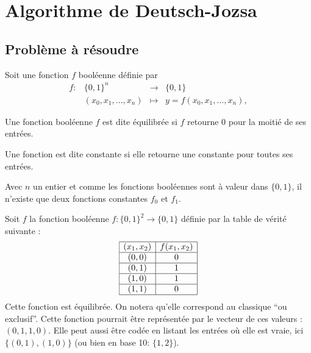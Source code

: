 \chapter{Algorithme de Deutsch-Jozsa}

\section{Problème à résoudre}
Soit une fonction $f$ booléenne définie par 
\[
  \begin{array}{llll}
    f :  &  \{0, 1\}^n              & \to       & \{ 0, 1 \} \\
         &  (x_0, x_1, \dots , x_n) & \mapsto   &  y = f(x_0, x_1, \dots , x_n), 
  \end{array}  
\]

\begin{definition}
  Une fonction booléenne $f$ est dite équilibrée si $f$ retourne 0
  pour la moitié de ses entrées.
\end{definition}

\begin{definition}
  Une fonction est dite constante si elle retourne une constante pour
  toutes ses entrées.
\end{definition}


\begin{rem}
  Avec $n$ un entier et comme les fonctions booléennes sont à valeur
  dans $\{0,1\}$, il n'existe que deux fonctions constantes $f_0$ et
  $f_1$.
\end{rem}

\begin{ex}
  Soit $f$ la fonction booléenne $f : \{0,1\}^2 \to \{0,1\}$ définie
  par la table de vérité suivante :
\[
  \begin{array}{|c|c|}
    \hline
   (x_1, x_2) & f(x_1,x_2) \\
    \hline
    (0,0) & 0 \\
    \hline
    (0,1) & 1 \\
    \hline
    (1,0) & 1 \\
    \hline
    (1,1) & 0 \\
    \hline
  \end{array}
\]
Cette fonction est équilibrée. On notera qu'elle correspond au
classique ``ou exclusif''. Cette fonction pourrait être représentée
par le vecteur de ces valeurs : $(0,1,1,0)$. Elle peut aussi être
codée en listant les entrées où elle est vraie, ici $\{(0,1),(1,0)\}$ (ou bien en base 10: $\{1, 2\}$).
\end{ex}

